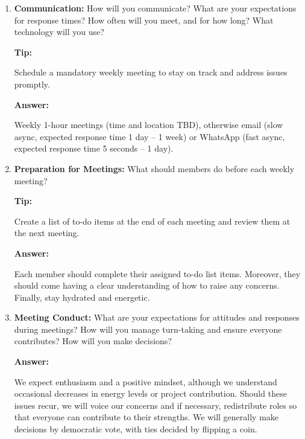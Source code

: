 \documentclass[12pt]{article}
\newenvironment{answer}[1][]{
  \color{blue}\textbf{Answer:}
}{}
\newenvironment{alice}[1][]{
  \color{black}\textbf{Tip:}
}{}
\begin{document}
\begin{enumerate}
\begin{answer}
We are all eager to contribute to developing the model. We plan to divide other tasks as they arise, as we currently aren't sure about our relative strengths and weaknesses. For example, William is typing up this document because he likes \LaTeX.

\end{answer}

\item {\bf Communication:} How will you communicate? What are your expectations for response times? How often will you meet, and for how long? What technology will you use?

\begin{alice}

Schedule a mandatory weekly meeting to stay on track and address issues promptly.
\end{alice}

\begin{answer}
Weekly 1-hour meetings (time and location TBD), otherwise email (slow async, expected response time 1 day -- 1 week) or WhatsApp (fast async, expected response time 5 seconds -- 1 day).

\end{answer}

\item {\bf Preparation for Meetings:} What should members do before each weekly meeting?

\begin{alice}

Create a list of to-do items at the end of each meeting and review them at the next meeting.

\end{alice}

\begin{answer}
Each member should complete their assigned to-do list items. Moreover, they should come having a clear understanding of how to raise any concerns. Finally, stay hydrated and energetic.
\end{answer}


\item {\bf Meeting Conduct:} What are your expectations for attitudes and responses during meetings? How will you manage turn-taking and ensure everyone contributes? How will you make decisions?

\begin{answer}
  We expect enthusiasm and a positive mindset, although we understand occasional decreases in energy levels or project contribution. Should these issues recur, we will voice our concerns and if necessary, redistribute roles so that everyone can contribute to their strengths. We will generally make decisions by democratic vote, with ties decided by flipping a coin.
\end{answer}


\end{enumerate}
\end{document}
